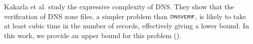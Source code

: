 Kakarla et al. \cite{dns-complex} study the expressive complexity of DNS. They show that the verification of DNS zone files, a simpler problem than $\verif$, is likely to take at least cubic time in
the number of records, effectively giving a lower bound. In this work, we provide an upper bound for this problem ().






    

























